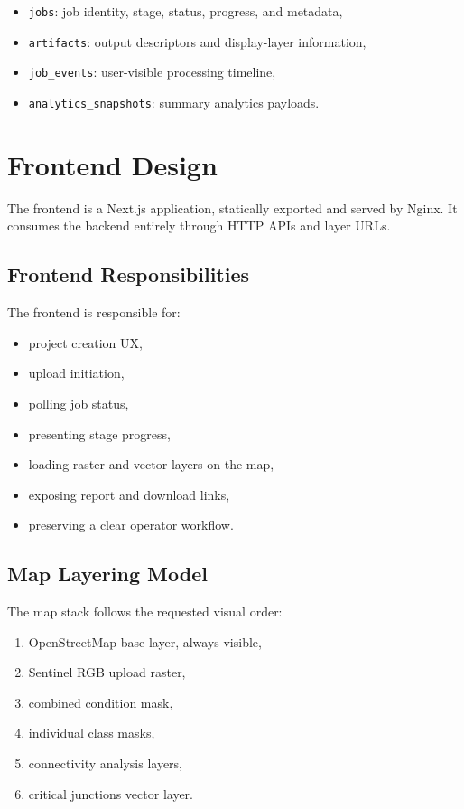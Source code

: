 \documentclass[conference]{IEEEtran}
\begin{document}
\begin{itemize}[leftmargin=16pt]
\item \texttt{jobs}: job identity, stage, status, progress, and metadata,
\item \texttt{artifacts}: output descriptors and display-layer information,
\item \texttt{job\_events}: user-visible processing timeline,
\item \texttt{analytics\_snapshots}: summary analytics payloads.
\end{itemize}

\section{Frontend Design}
The frontend is a Next.js application, statically exported and served by Nginx.
It consumes the backend entirely through HTTP APIs and layer URLs.

\subsection{Frontend Responsibilities}
The frontend is responsible for:

\begin{itemize}[leftmargin=16pt]
\item project creation UX,
\item upload initiation,
\item polling job status,
\item presenting stage progress,
\item loading raster and vector layers on the map,
\item exposing report and download links,
\item preserving a clear operator workflow.
\end{itemize}

\subsection{Map Layering Model}
The map stack follows the requested visual order:

\begin{enumerate}[leftmargin=16pt]
\item OpenStreetMap base layer, always visible,
\item Sentinel RGB upload raster,
\item combined condition mask,
\item individual class masks,
\item connectivity analysis layers,
\item critical junctions vector layer.
\end{enumerate}
\end{document}
